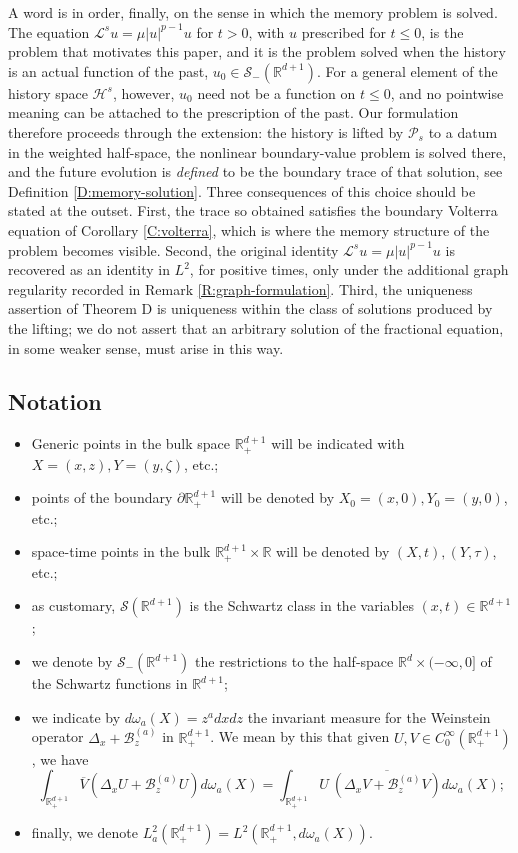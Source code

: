 \documentclass[11pt,letter]{amsart}
\def \RNu {\mathbb{R}^{d+1}}
\def \RN {\mathbb{R}_+^{d+1}}
\def \R {\mathbb{R}}
\newcommand{\Ba}{\mathscr B_z^{(a)}}
\newcommand{\Rd}{\mathbb R^d}
\newcommand{\p}{\partial}
\numberwithin{equation}{section}
\newcommand{\Le}{\mathcal L}
\newcommand{\RNm}{\Rd\times (-\infty,0]}
\newcommand{\Sm}{\mathscr S_-(\RNu)}
\numberwithin{equation}{section}
\begin{document}
A word is in order, finally, on the sense in which the memory problem is solved.
The equation $\Le^su=\mu|u|^{p-1}u$ for $t>0$, with $u$ prescribed for $t\le0$,
is the problem that motivates this paper, and it is the problem solved when the
history is an actual function of the past, $u_0\in\Sm$. For a general element of
the history space $\mathcal H^s$, however, $u_0$ need not be a function on
$t\le0$, and no pointwise meaning can be attached to the prescription of the
past. Our formulation therefore proceeds through the extension: the history is
lifted by $\mathcal P_s$ to a datum in the weighted half-space, the nonlinear
boundary-value problem is solved there, and the future evolution is
\emph{defined} to be the boundary trace of that solution, see
Definition \ref{D:memory-solution}. Three consequences of this choice should be
stated at the outset. First, the trace so obtained satisfies the boundary
Volterra equation of Corollary \ref{C:volterra}, which is where the memory
structure of the problem becomes visible. Second, the original identity
$\Le^su=\mu|u|^{p-1}u$ is recovered as an identity in $L^2$, for positive times,
only under the additional graph regularity recorded in
Remark \ref{R:graph-formulation}. Third, the uniqueness assertion of Theorem D
is uniqueness within the class of solutions produced by the lifting; we do not
assert that an arbitrary solution of the fractional equation, in some weaker
sense, must arise in this way.


\subsection{Notation}\label{S:not}
\begin{itemize}
\item Generic points in the bulk space $\RN$ will be indicated with $X = (x,z), Y = (y,\zeta)$, etc.;
\item points of the boundary 
$\p \RN$ will be denoted by $X_0 = (x,0), Y_0 = (y,0)$, etc.; 
\item space-time points in the bulk $\RN\times \R$ will be denoted by
$(X,t), (Y,\tau)$, etc.; 
\item as customary, $\mathscr S(\R^{d+1})$ is the Schwartz class in the variables $(x,t)\in \R^{d+1}$;
\item we  denote by $\Sm$ the restrictions to the half-space $\RNm$ of the Schwartz functions in $\RNu$;
\item we indicate by  $d\omega_a(X) = z^a dx dz$ the invariant measure for the Weinstein operator $\Delta_x +\Ba$ in $\RN$. We mean by this that given $U, V\in C^\infty_0(\RN)$, we have 
 \[
\int_{\RN} \overline V(\Delta_x U + \Ba U)d\omega_a(X) = \int_{\RN} U\ \overline{(\Delta_x V + \Ba V)}d\omega_a(X);
\]
\item finally, we denote $L^2_a(\RN) =  L^2(\RN,d\omega_a(X))$. 
\end{itemize}
\end{document}
